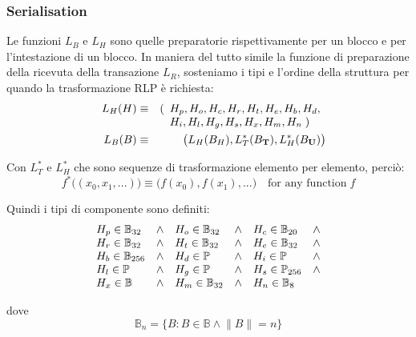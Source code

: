 \documentclass[9pt,oneside]{amsart}
\begin{document}
\begin{multicols}{2}
\subsubsection{Serialisation}

Le funzioni $L_B$ e $L_H$ sono quelle preparatorie rispettivamente per un blocco e per l'intestazione di un blocco. In maniera del tutto simile la funzione di preparazione della ricevuta della transazione $L_R$, sosteniamo i tipi e l'ordine della struttura per quando la trasformazione RLP è richiesta:
\begin{eqnarray}
\quad L_H(H) & \equiv & (\begin{array}[t]{l}H_p, H_o, H_c, H_r, H_t, H_e, H_b, H_d,\\ H_i, H_l, H_g, H_s, H_x, H_m, H_n \; )\end{array} \\
\quad L_B(B) & \equiv & \big( L_H(B_H), L_T^*(B_\mathbf{T}), L_H^*(B_\mathbf{U}) \big)
\end{eqnarray}

Con $L_T^*$ e $L_H^*$ che sono sequenze di trasformazione elemento per elemento, perciò:
\begin{equation}
f^*\big( (x_0, x_1, ...) \big) \equiv \big( f(x_0), f(x_1), ... \big) \quad \text{for any function} \; f
\end{equation}

Quindi i tipi di componente sono definiti:
\begin{equation}
\begin{array}[t]{lclclcl}
H_p \in \mathbb{B}_{32} & \wedge & H_o \in \mathbb{B}_{32} & \wedge & H_c \in \mathbb{B}_{20} & \wedge \\
H_r \in \mathbb{B}_{32} & \wedge & H_t \in \mathbb{B}_{32} & \wedge & H_e \in \mathbb{B}_{32} & \wedge \\
H_b \in \mathbb{B}_{256} & \wedge & H_d \in \mathbb{P} & \wedge & H_i \in \mathbb{P} & \wedge \\
H_l \in \mathbb{P} & \wedge & H_g \in \mathbb{P} & \wedge & H_s \in \mathbb{P}_{256} & \wedge \\
H_x \in \mathbb{B} & \wedge & H_m \in \mathbb{B}_{32} & \wedge & H_n \in \mathbb{B}_{8}
\end{array}
\end{equation}

dove
\begin{equation}
\mathbb{B}_n = \{ B: B \in \mathbb{B} \wedge \lVert B \rVert = n \}
\end{equation}


\end{multicols}
\end{document}
